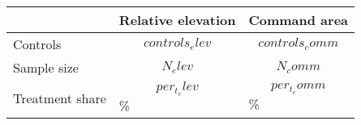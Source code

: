 \begin{center}
\begin{tabular}{l l l}
  & Relative elevation & Command area \\
  \hline
 Controls & $$controls_elev$$ & $$controls_comm$$ \\  
 Sample size & $$N_elev$$ & $$N_comm$$ \\
 Treatment share & $$per_t_elev$$\% & $$per_t_comm$$\% \\
\end{tabular}
\end{center}
